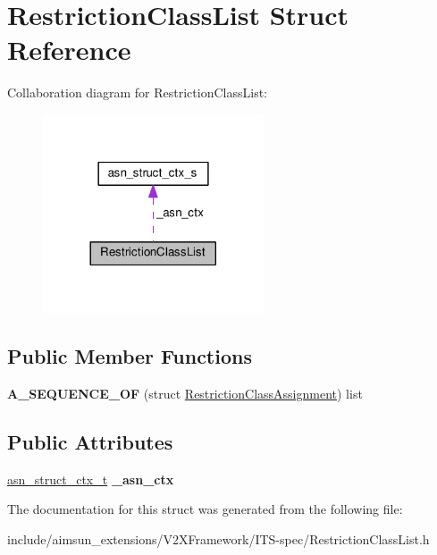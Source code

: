 \hypertarget{structRestrictionClassList}{}\section{Restriction\+Class\+List Struct Reference}
\label{structRestrictionClassList}


Collaboration diagram for Restriction\+Class\+List\+:\nopagebreak
\begin{figure}[H]
\begin{center}
\leavevmode
\includegraphics[width=185pt]{structRestrictionClassList__coll__graph}
\end{center}
\end{figure}
\subsection*{Public Member Functions}
\begin{DoxyCompactItemize}
\item 
{\bfseries A\+\_\+\+S\+E\+Q\+U\+E\+N\+C\+E\+\_\+\+OF} (struct \hyperlink{structRestrictionClassAssignment}{Restriction\+Class\+Assignment}) list\hypertarget{structRestrictionClassList_a435adf5e073ad35db4ecbac9ef8bdc96}{}\label{structRestrictionClassList_a435adf5e073ad35db4ecbac9ef8bdc96}

\end{DoxyCompactItemize}
\subsection*{Public Attributes}
\begin{DoxyCompactItemize}
\item 
\hyperlink{structasn__struct__ctx__s}{asn\+\_\+struct\+\_\+ctx\+\_\+t} {\bfseries \+\_\+asn\+\_\+ctx}\hypertarget{structRestrictionClassList_ae457c1524d80bedf3c4c71adb4795b2a}{}\label{structRestrictionClassList_ae457c1524d80bedf3c4c71adb4795b2a}

\end{DoxyCompactItemize}


The documentation for this struct was generated from the following file\+:\begin{DoxyCompactItemize}
\item 
include/aimsun\+\_\+extensions/\+V2\+X\+Framework/\+I\+T\+S-\/spec/Restriction\+Class\+List.\+h\end{DoxyCompactItemize}
